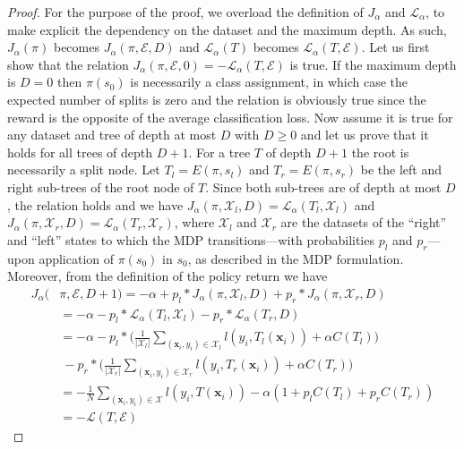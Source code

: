 \begin{proof}
For the purpose of the proof, we overload the definition of $J_\alpha$ and $\mathcal L_\alpha$, to make explicit the dependency on the dataset and the maximum depth. 
As such, $J_\alpha(\pi)$ becomes $J_\alpha(\pi, {\mathcal E}, D)$ and ${\mathcal L}_\alpha(T)$ becomes ${\mathcal L}_\alpha(T, {\mathcal E})$. 
Let us first show that the relation $J_\alpha(\pi, {\mathcal E}, 0) = -{\mathcal L}_\alpha(T, {\mathcal E})$ is true. 
If the maximum depth is $D = 0$ then $\pi(s_0)$ is necessarily a class assignment, in which case the expected number of splits is zero and the relation is obviously true since the reward is the opposite of the average classification loss. 
Now assume it is true for any dataset and tree of depth at most $D$ with $D \geq 0$ and let us prove that it holds for all trees of depth $D + 1$. 
For a tree $T$ of depth $D + 1$ the root is necessarily a split node. Let $T_l = E(\pi, s_l)$ and $T_r = E(\pi, s_r)$ be the left and right sub-trees of the root node of $T$. 
Since both sub-trees are of depth at most $D$, the relation holds and we have $J_\alpha(\pi, \mathcal{X}_l, D) = {\mathcal L}_\alpha(T_l, \mathcal{X}_l)$ and $J_\alpha(\pi, \mathcal{X}_r, D) = {\mathcal L}_\alpha(T_r, \mathcal{X}_r)$, where $\mathcal{X}_l$ and $\mathcal{X}_r$ are the datasets of the ``right'' and ``left'' states to which the MDP transitions---with probabilities $p_l$ and $p_r$---upon application of $\pi(s_0)$ in $s_0$, as described in the MDP formulation. 
Moreover, from the definition of the policy return we have 
\begin{align*}
   J_\alpha(&\pi, {\mathcal E}, D + 1) = -\alpha + p_l * J_\alpha(\pi, \mathcal{X}_l, D) + p_r * J_\alpha(\pi, \mathcal{X}_r, D)\\
   &= -\alpha - p_l * {\mathcal L}_\alpha(T_l, \mathcal{X}_l) - p_r * {\mathcal L}_\alpha(T_r, D)\\
   &= -\alpha - p_l * \Bigg(\frac{1}{|\mathcal{X}_l|}\sum_{(\boldsymbol{x}_i, y_i)\in \mathcal{X}_l}l(y_i, T_l(\boldsymbol{x}_i))  + \alpha C(T_l)\Bigg)\\
   &\ - p_r * \Bigg(\frac{1}{|\mathcal{X}_r|}\sum_{(\boldsymbol{x}_i, y_i)\in \mathcal{X}_r}l(y_i, T_r(\boldsymbol{x}_i))  + \alpha C(T_r)\Bigg)\\
   &= -\frac{1}{N}\sum_{(\boldsymbol{x}_i, y_i)\in \mathcal{X}}l(y_i, T(\boldsymbol{x}_i)) - \alpha (1 + p_l C(T_l) + p_r C(T_r))\\
   &= -{\mathcal L}(T, {\mathcal E}) 
\end{align*}
\end{proof}

